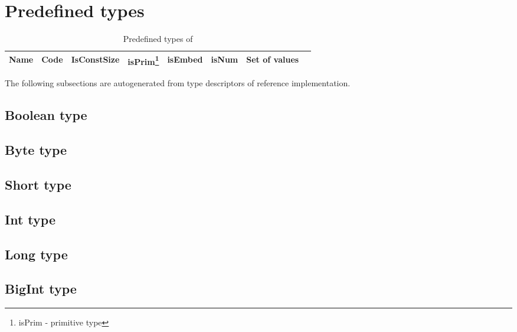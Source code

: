 \section{Predefined types}
\label{sec:appendix:predeftypes}

\begin{table}[h]
    \small
    \begin{tabu}{|l |l |l |l |l |l |l |l|}
     \hline
     \rowfont{\bfseries}
        Name   &   Code   &  IsConstSize & 
        isPrim\footnote{isPrim - primitive type} & 
        isEmbed  & isNum & Set of values \\
        \hline



    \hline
    \end{tabu}
    \caption{Predefined types of \langname}
    \label{table:predeftypes}
\end{table}

The following subsections are autogenerated from type descriptors 
of \langname reference implementation.

\subsection{Boolean type}
\label{sec:type:Boolean}


\subsection{Byte type}
\label{sec:type:Byte}


\subsection{Short type}
\label{sec:type:Short}


\subsection{Int type}
\label{sec:type:Int}


\subsection{Long type}
\label{sec:type:Long}


\subsection{BigInt type}
\label{sec:type:BigInt}



